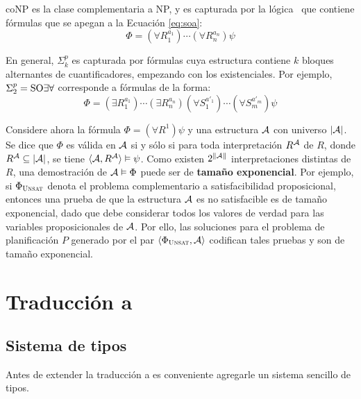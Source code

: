 coNP es la clase complementaria a NP, y es capturada por la lógica \SOA\ 
que contiene fórmulas que se apegan a la Ecuación \ref{eq:soa}:
\begin{equation}
\label{eq:soa}
\Phi = (\forall R_1^{a_1})\cdots(\forall R_n^{a_n})\psi
\end{equation}

En general, $\Sigma^p_k$ es capturada por fórmulas cuya estructura contiene $k$
bloques alternantes de cuantificadores, empezando con los existenciales. Por
ejemplo, $\Sigma^p_2=\text{SO}\exists\forall$ corresponde a fórmulas de la forma:
\begin{equation}
\Phi = (\exists R_1^{a_1}) \cdots (\exists R_n^{a_n}) 
       (\forall S_1^{a'_1}) \cdots (\forall S_m^{a'_m})
       \psi
\end{equation}

%

Considere ahora la fórmula $\Phi=(\forall R^1)\psi$
y una estructura $\mathcal{A}$ con universo $|\mathcal{A}|$.
Se dice que $\Phi$ es válida en $\mathcal{A}$ si y sólo si para toda
interpretación $R^{\mathcal{A}}$ de $R$, donde $R^{\mathcal{A}} \subseteq |\mathcal{A}|$, se tiene
$\langle \mathcal{A},R^{\mathcal{A}} \rangle\vDash\psi$. Como existen $2^{\|\mathcal{A}\|}$ interpretaciones
distintas de $R$, una demostración de $\mathcal{A}\vDash\Phi$ puede ser de
\textbf{tamaño exponencial}. Por ejemplo, si $\Phi_{\textsc{Unsat}}$ denota el problema
complementario a satisfacibilidad proposicional, entonces una prueba de que la
estructura $\mathcal{A}$ es no satisfacible es de tamaño exponencial, dado que debe
considerar todos los valores de verdad para las variables proposicionales de
$\mathcal{A}$. Por ello, las soluciones para el problema de planificación $P$ generado
por el par $\langle \Phi_{\textsc{Unsat}},\mathcal{A} \rangle$ codifican tales pruebas y son de tamaño
exponencial.

\section{Traducción a \STRIPS}

\subsection{Sistema de tipos}
Antes de extender la traducción a \PH es conveniente agregarle un sistema
sencillo de tipos.

